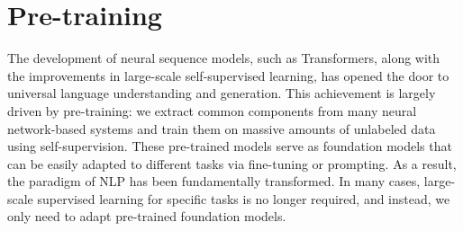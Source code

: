 
%




\chapter{Pre-training}

\thispagestyle{chapterurl} %

\noindent The development of neural sequence models, such as Transformers, along with the improvements in large-scale self-supervised learning, has opened the door to universal language understanding and generation. This achievement is largely driven by pre-training: we extract common components from many neural network-based systems and train them on massive amounts of unlabeled data using self-supervision. These pre-trained models serve as foundation models that can be easily adapted to different tasks via fine-tuning or prompting. As a result, the paradigm of NLP has been fundamentally transformed. In many cases, large-scale supervised learning for specific tasks is no longer required, and instead, we only need to adapt pre-trained foundation models.

